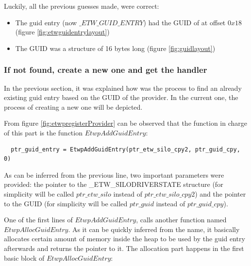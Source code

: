   Luckily, all the previous guesses made, were correct:
  \begin{itemize}
    \item The guid entry (now $\_ETW\_GUID\_ENTRY$) had the GUID of at offset $0x18$ (figure \ref{fig:etwguidentrylayout})
    \item The GUID was a structure of 16 bytes long (figure \ref{fig:guidlayout})
  \end{itemize}




\subsubsection{If not found, create a new one and get the handler}
In the previous section, it was explained how was the process to find an already existing guid entry based on the GUID of the provider. In the current one, the process of creating a new one will be depicted. 

From figure \ref{fig:etwpregisterProvider} can be observed that the function in charge of this part is the function $EtwpAddGuidEntry$:

\begin{verbatim}
  ptr_guid_entry = EtwpAddGuidEntry(ptr_etw_silo_cpy2, ptr_guid_cpy, 0)
\end{verbatim}

As can be inferred from the previous line, two important parameters were provided: the pointer to the \_ETW\_SILODRIVERSTATE structure (for simplicity will be called $ptr\_etw\_silo$ instead of $ptr\_etw\_silo\_cpy2$) and the pointer to the GUID (for simplicity will be called $ptr\_guid$ instead of $ptr\_guid\_cpy$).

One of the first lines of $EtwpAddGuidEntry$, calls another function named $EtwpAllocGuidEntry$. As it can be quickly inferred from the name, it basically allocates certain amount of memory inside the heap to be used by the guid entry afterwards and returns the pointer to it. The allocation part happens in the first basic block of $EtwpAllocGuidEntry$:

